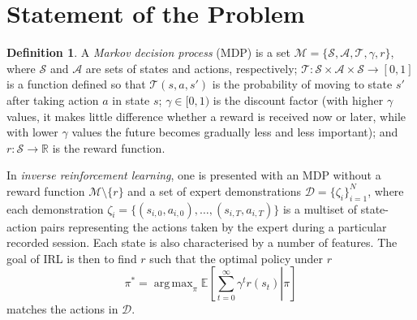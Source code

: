 \documentclass{mprop}
\theoremstyle{definition}
\newtheorem{definition}{Definition}
\DeclareMathOperator*{\argmax}{arg\,max}
\begin{document}
\section{Statement of the Problem}

\begin{definition}
  A \emph{Markov decision process} (MDP) is a set $\mathcal{M} = \{ \mathcal{S},
  \mathcal{A}, \mathcal{T}, \gamma, r \}$, where $\mathcal{S}$ and
  $\mathcal{A}$ are sets of states and actions, respectively; $\mathcal{T} :
  \mathcal{S} \times \mathcal{A} \times \mathcal{S} \to [0, 1]$ is a function
  defined so that $\mathcal{T}(s, a, s')$ is the probability of moving to state $s'$
  after taking action $a$ in state $s$; $\gamma \in [0, 1)$ is the discount
  factor (with higher $\gamma$ values, it makes little difference whether a
  reward is received now or later, while with lower $\gamma$ values the future
  becomes gradually less and less important); and $r : \mathcal{S} \to
  \mathbb{R}$ is the reward function.
\end{definition}

In \emph{inverse reinforcement learning}, one is presented with an MDP without a
reward function $\mathcal{M} \setminus \{ r \}$ and a set of expert
demonstrations $\mathcal{D} = \{ \zeta_i \}_{i=1}^N$, where each demonstration
$\zeta_i = \{ (s_{i,0}, a_{i,0}), \dots, (s_{i,T}, a_{i,T}) \}$ is a multiset of
state-action pairs representing the actions taken by the expert during a
particular recorded session. Each state is also characterised by a number of
features. The goal of IRL is then to find $r$ such that the optimal policy under
$r$
\[ \pi^* = \argmax_\pi \mathbb{E}\left[ \left. \sum_{t=0}^\infty \gamma^t r(s_t)
    \right| \pi \right] \]
matches the actions in $\mathcal{D}$.
\end{document}
